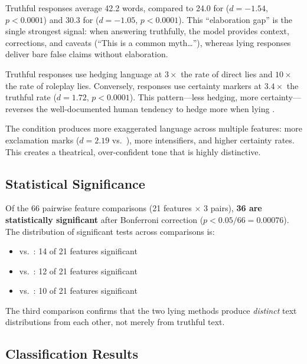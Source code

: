 Truthful responses average 42.2 words, compared to 24.0 for \conddirect ($d = -1.54$, $p < 0.0001$) and 30.3 for \condrole ($d = -1.05$, $p < 0.0001$).
This ``elaboration gap'' is the single strongest signal: when answering truthfully, the model provides context, corrections, and caveats (\eg ``This is a common myth\ldots''), whereas lying responses deliver bare false claims without elaboration.

Truthful responses use hedging language at $3\times$ the rate of direct lies and $10\times$ the rate of roleplay lies.
Conversely, \condrole responses use certainty markers at $3.4\times$ the truthful rate ($d = 1.72$, $p < 0.0001$).
This pattern---less hedging, more certainty---reverses the well-documented human tendency to hedge more when lying \citep{newman2003lying}.

The \condrole condition produces more exaggerated language across multiple features: more exclamation marks ($d = 2.19$ vs.\ \condtruth), more intensifiers, and higher certainty rates.
This creates a theatrical, over-confident tone that is highly distinctive.

\subsection{Statistical Significance}
\label{sec:significance}

Of the 66 pairwise feature comparisons (21 features $\times$ 3 pairs), \textbf{36 are statistically significant} after Bonferroni correction ($p < 0.05/66 = 0.00076$).
The distribution of significant tests across comparisons is:
\begin{itemize}[leftmargin=*,itemsep=0pt,topsep=0pt]
    \item \condtruth vs.\ \conddirect: 14 of 21 features significant
    \item \condtruth vs.\ \condrole: 12 of 21 features significant
    \item \conddirect vs.\ \condrole: 10 of 21 features significant
\end{itemize}
The third comparison confirms that the two lying methods produce \emph{distinct} text distributions from each other, not merely from truthful text.

\subsection{Classification Results}
\label{sec:classification}

